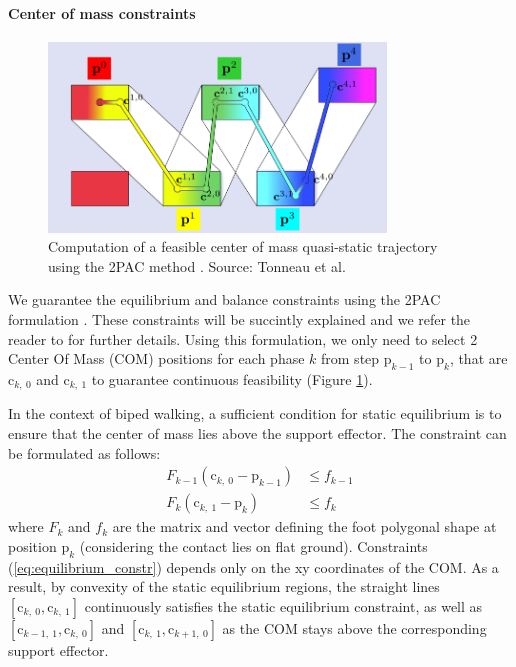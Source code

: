 \paragraph{Center of mass constraints}
\begin{figure}[t]
    \centering
    \captionsetup[subfigure]{justification=centering}
    \includegraphics[width=0.8\textwidth]{Figures/Appendix/2pac_feasibility.png}
    \caption{Computation of a feasible center of mass quasi-static trajectory using the 2PAC method \cite{Tonneau2018_2PAC}. Source: Tonneau et al. \cite{sl1m_v1}}
    \label{fig:mip:feasibility_constr}
\end{figure}
We guarantee the equilibrium and balance constraints using the 2PAC formulation \cite{Tonneau2018_2PAC}.
These constraints will be succintly explained and we refer the reader to \cite{sl1m_v1} for further details.
Using this formulation, we only need to select 2 Center Of Mass (COM) positions for each phase $k$ from step $\mbox{p}_{k-1}$ to $\mbox{p}_k$, that are $\mbox{c}_{k,\:0}$ and $\mbox{c}_{k,\:1}$ to guarantee continuous feasibility (Figure \ref{fig:mip:feasibility_constr}).

In the context of biped walking, a sufficient condition for static equilibrium is to ensure that the center of mass lies above the support effector.
The constraint can be formulated as follows:
\begin{equation}
    \label{eq:equilibrium_constr}
    \begin{aligned}
        F_{k-1} (\mbox{c}_{k,\:0}-\mbox{p}_{k-1}) &\leq  f_{k-1}\\%
        F_{k} (\mbox{c}_{k,\:1}-\mbox{p}_{k}) &\leq  f_{k}%
    \end{aligned}
\end{equation}
where $F_k$ and $f_k$ are the matrix and vector defining the foot polygonal shape at position $\mbox{p}_k$ (considering the contact lies on flat ground).
Constraints (\ref{eq:equilibrium_constr}) depends only on the xy coordinates of the COM.
As a result, by convexity of the static equilibrium regions, the straight lines $[\mbox{c}_{k,\:0}, \mbox{c}_{k,\:1}]$ continuously satisfies the static equilibrium
constraint, as well as $[\mbox{c}_{k-1,\:1}, \mbox{c}_{k,\:0}]$ and $[\mbox{c}_{k,\:1}, \mbox{c}_{k+1,\:0}]$ as the COM stays above the corresponding support effector.

